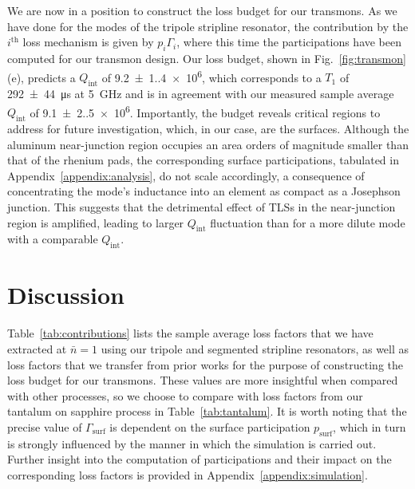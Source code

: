 \documentclass[
    reprint,
    superscriptaddress,
    amsmath,amssymb,
    aps,
    prb,
    floatfix,
]{revtex4-2}
\begin{document}
We are now in a position to construct the loss budget for our transmons. As we have done for the modes of the tripole stripline resonator, the contribution by the $i^\mathrm{th}$ loss mechanism is given by $p_i\Gamma_i$, where this time the participations have been computed for our transmon design. Our loss budget, shown in Fig.~\ref{fig:transmon}(e), predicts a $Q_\mathrm{int}$ of \num{9.2(1.4)e6}, which corresponds to a $T_1$ of \SI{292(44)}{\micro\second} at \SI{5}{\giga\hertz} and is in agreement with our measured sample average $Q_\mathrm{int}$ of \num{9.1(2.5)e6}. Importantly, the budget reveals critical regions to address for future investigation, which, in our case, are the surfaces. Although the aluminum near-junction region occupies an area orders of magnitude smaller than that of the rhenium pads, the corresponding surface participations, tabulated in Appendix~\ref{appendix:analysis}, do not scale accordingly, a consequence of concentrating the mode's inductance into an element as compact as a Josephson junction. This suggests that the detrimental effect of TLSs in the near-junction region is amplified, leading to larger $Q_\mathrm{int}$ fluctuation than for a more dilute mode with a comparable $Q_\mathrm{int}$.

\section{Discussion}\label{section:discussion}

Table~\ref{tab:contributions} lists the sample average loss factors that we have extracted at $\bar{n}=1$ using our tripole and segmented stripline resonators, as well as loss factors that we transfer from prior works for the purpose of constructing the loss budget for our transmons. These values are more insightful when compared with other processes, so we choose to compare with loss factors from our tantalum on sapphire process \cite{ganjam2024} in Table~\ref{tab:tantalum}. It is worth noting that the precise value of $\Gamma_\mathrm{surf}$ is dependent on the surface participation $p_\mathrm{surf}$, which in turn is strongly influenced by the manner in which the simulation is carried out. Further insight into the computation of participations and their impact on the corresponding loss factors is provided in Appendix~\ref{appendix:simulation}.
\end{document}

